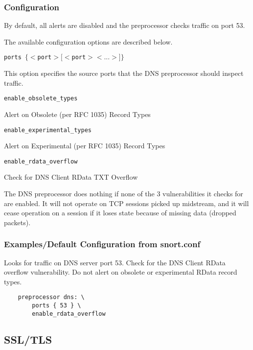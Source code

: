 \documentclass[english]{report}
\newcounter{slistnum}
\newenvironment{slist}
{ \begin{list}{ {\bf \arabic{slistnum}.} }{\usecounter{slistnum} } }
{ \end{list} }
\begin{document}
\subsubsection{Configuration}

By default, all alerts are disabled and the preprocessor checks traffic on port
53.

The available configuration options are described below.

\begin{slist}

\item \texttt{ports $\{ <$port$> [<$port$> <...>] \}$}

This option specifies the source ports that the DNS preprocessor should inspect
traffic.

\item \texttt{enable\_obsolete\_types}

Alert on Obsolete (per RFC 1035) Record Types

\item \texttt{enable\_experimental\_types}

Alert on Experimental (per RFC 1035) Record Types

\item \texttt{enable\_rdata\_overflow}

Check for DNS Client RData TXT Overflow

\end{slist}

The DNS preprocessor does nothing if none of the 3 vulnerabilities it checks
for are enabled.  It will not operate on TCP sessions picked up midstream, and
it will cease operation on a session if it loses state because of missing data
(dropped packets).

\subsubsection{Examples/Default Configuration from snort.conf}

Looks for traffic on DNS server port 53.  Check for the DNS Client RData
overflow vulnerability.  Do not alert on obsolete or experimental RData record
types.

\begin{verbatim}
    preprocessor dns: \
        ports { 53 } \
        enable_rdata_overflow
\end{verbatim}

\subsection{SSL/TLS}
\label{sub:SSL/TLS}
\end{document}
